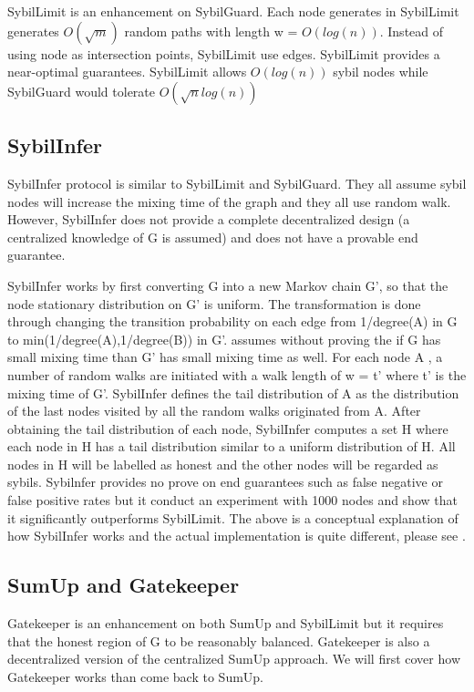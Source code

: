 \documentclass[conference]{IEEEtran}
\begin{document}
SybilLimit is an enhancement on SybilGuard. Each node generates in SybilLimit generates $O(\sqrt m)$ random paths with length w = $O(log(n))$. Instead of using node as intersection points, SybilLimit use edges. SybilLimit provides a near-optimal guarantees. SybilLimit allows $O(log(n))$ sybil nodes while SybilGuard would tolerate $O(\sqrt n log(n))$

\subsection{SybilInfer}
SybilInfer \cite{danezis09sybilinfer} protocol is similar to SybilLimit and SybilGuard. They all assume sybil nodes will increase the mixing time of the graph and they all use random walk. However, SybilInfer does not provide a complete decentralized design (a centralized knowledge of G is assumed) and does not have a provable end guarantee.


SybilInfer works by first converting G into a new Markov chain G', so that the node stationary distribution on G' is uniform. The transformation is done through changing the transition probability on each edge from 1/degree(A) in G to min(1/degree(A),1/degree(B)) in G'. \cite{danezis09sybilinfer} assumes without proving the if G has small mixing time than G' has small mixing time as well. For each node A , a number of random walks are initiated with a walk length of w = t' where t' is the mixing time of G'. SybilInfer defines the tail distribution of A as the distribution of the last nodes visited by all the random walks originated from A. After obtaining the tail distribution of each node, SybilInfer computes a set H where each node in H has a tail distribution similar to a uniform distribution of H. All nodes in H will be labelled as honest and the other nodes will be regarded as sybils. Sybilnfer provides no prove on end guarantees such as false negative or false positive rates but it conduct an experiment with 1000 nodes and show that it significantly outperforms SybilLimit. The above is a conceptual explanation of how SybilInfer works and the actual implementation is quite different, please see \cite{danezis09sybilinfer}.

\subsection{SumUp and Gatekeeper}
Gatekeeper \cite{tran11optimal} is an enhancement on both SumUp and SybilLimit but it requires that the honest region of G to be reasonably balanced. Gatekeeper is also a decentralized version of the centralized SumUp approach. We will first cover how Gatekeeper works than come back to SumUp.
\end{document}
